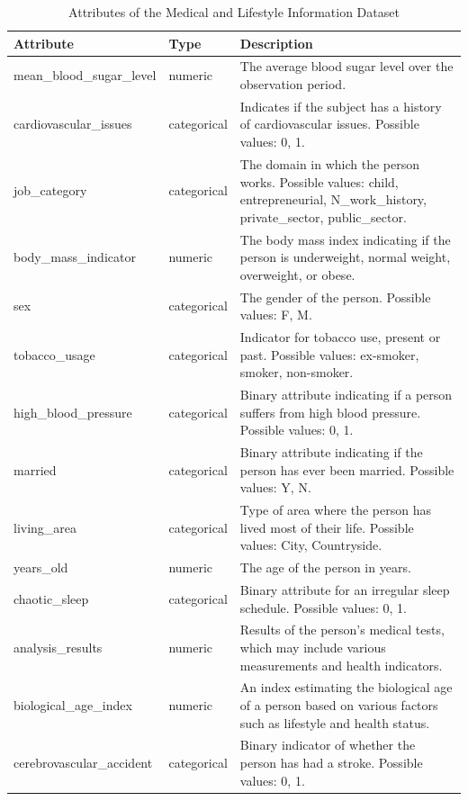 \documentclass[a4paper,12pt]{article}
\begin{document}
\begin{table}[H]
    \centering
    \caption{Attributes of the Medical and Lifestyle Information Dataset}
    \begin{tabular}{|l|l|p{10cm}|}
    \hline
    \textbf{Attribute} & \textbf{Type} & \textbf{Description} \\ \hline
    mean\_blood\_sugar\_level & numeric & The average blood sugar level over the observation period. \\ \hline
    cardiovascular\_issues & categorical & Indicates if the subject has a history of cardiovascular issues. Possible values: 0, 1. \\ \hline
    job\_category & categorical & The domain in which the person works. Possible values: child, entrepreneurial, N\_work\_history, private\_sector, public\_sector. \\ \hline
    body\_mass\_indicator & numeric & The body mass index indicating if the person is underweight, normal weight, overweight, or obese. \\ \hline
    sex & categorical & The gender of the person. Possible values: F, M. \\ \hline
    tobacco\_usage & categorical & Indicator for tobacco use, present or past. Possible values: ex-smoker, smoker, non-smoker. \\ \hline
    high\_blood\_pressure & categorical & Binary attribute indicating if a person suffers from high blood pressure. Possible values: 0, 1. \\ \hline
    married & categorical & Binary attribute indicating if the person has ever been married. Possible values: Y, N. \\ \hline
    living\_area & categorical & Type of area where the person has lived most of their life. Possible values: City, Countryside. \\ \hline
    years\_old & numeric & The age of the person in years. \\ \hline
    chaotic\_sleep & categorical & Binary attribute for an irregular sleep schedule. Possible values: 0, 1. \\ \hline
    analysis\_results & numeric & Results of the person's medical tests, which may include various measurements and health indicators. \\ \hline
    biological\_age\_index & numeric & An index estimating the biological age of a person based on various factors such as lifestyle and health status. \\ \hline
    cerebrovascular\_accident & categorical & Binary indicator of whether the person has had a stroke. Possible values: 0, 1. \\ \hline
    \end{tabular}
    \end{table}
    
\end{document}
